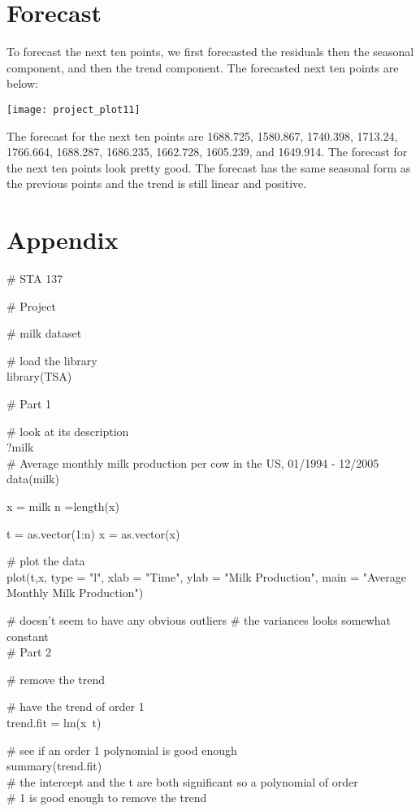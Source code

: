 \documentclass{article}
\begin{document}
\section*{Forecast}

To forecast the next ten points, we first forecasted the residuals then the seasonal component, and then the trend component. The forecasted next ten points are below:

\texttt{[image: project\_plot11]}

The forecast for the next ten points are 1688.725, 1580.867, 1740.398, 1713.24, 1766.664, 1688.287, 1686.235, 1662.728, 1605.239, and 1649.914. The forecast for the next ten points look pretty good. The forecast has the same seasonal form as the previous points and the trend is still linear and positive. 

\pagebreak

\section*{Appendix}

\# STA 137 

\# Project 

\# milk dataset 

\# load the library \\
library(TSA)

\# Part 1

\# look at its description \\
?milk \\
\# Average monthly milk production per cow in the US, 01/1994 - 12/2005
data(milk)

x = milk 
n =length(x) 

t = as.vector(1:n)
x = as.vector(x)

\# plot the data \\
plot(t,x, type = "l", xlab = "Time", ylab = "Milk Production", 
     main = "Average Monthly Milk Production")

\# doesn't seem to have any obvious outliers
\# the variances looks somewhat constant \\

  
\# Part 2 


\# remove the trend 
  
\# have the trend of order 1 \\
trend.fit = lm(x~t)

\# see if an order 1 polynomial is good enough \\
summary(trend.fit) \\
\# the intercept and the t are both significant so a polynomial of order \\
\# 1 is good enough to remove the trend 
\end{document}
